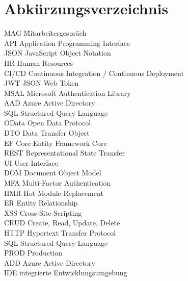 \documentclass[a4paper, 10pt, pdftex, twoside=false, numbers=noenddot, fleqn]{scrbook}
\begin{document}
	
	
	\tableofcontents

    \listoffigures
    \newpage

    \listoftables
    \newpage

      \section*{Abkürzungsverzeichnis}
\label{abkuerzungen}
\begin{tabbing}
MAG \hspace{1cm} \= Mitarbeitergespräch \\
API \> Application Programming Interface \\
JSON \> JavaScript Object Notation \\
HR \> Human Resources \\
CI/CD \> Continuous Integration / Continuous Deployment \\
JWT \> JSON Web Token \\
MSAL \> Microsoft Authentication Library \\
AAD \> Azure Active Directory \\
SQL \> Structured Query Language \\
OData \> Open Data Protocol \\
DTO \> Data Transfer Object \\
EF Core \> Entity Framework Core \\
REST \> Representational State Transfer \\
UI \> User Interface \\
DOM \> Document Object Model \\
MFA \> Multi-Factor Authentication \\
HMR \> Hot Module Replacement \\
ER \> Entity Relationship \\
XSS \> Cross-Site Scripting \\
CRUD \> Create, Read, Update, Delete \\
HTTP \> Hypertext Transfer Protocol \\
SQL \> Structured Query Language \\
PROD\> Production \\
ADD  \> Azure Active Directory \\
IDE \> integrierte Entwicklungsumgebung \\
\end{tabbing}


	
	
	
	
	
	
	

    
	
	\printbibliography[heading=bibintoc, title={Literaturverzeichnis}]
        
\end{document}
